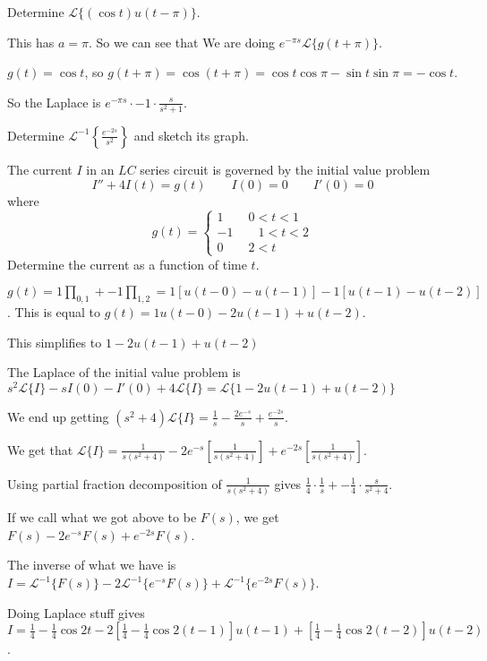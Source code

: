 \documentclass[../diffeq.tex]{subfiles}
\begin{document}
\begin{example}
    Determine $\mathcal{L}\{(\cos t)u(t-\pi)\}$.

    This has $a=\pi$. So we can see that We are doing $e^{-\pi s}\mathcal{L}\{g(t+\pi)\}$.

    $g(t)=\cos t$, so $g(t+\pi)=\cos(t+\pi)=\cos t \cos \pi - \sin t\sin \pi = -\cos t$.

    So the Laplace is $e^{-\pi s}\cdot -1\cdot \frac{s}{s^2+1}$.
\end{example}

\ex Determine $\mathcal{L}^{-1}\left\{\frac{e^{-2s}}{s^2}\right\}$ and sketch its graph.

\begin{example}
    The current $I$ in an $LC$ series circuit is governed by the initial value problem 
    \[ I''+4I(t)=g(t) \qquad I(0)=0 \qquad I'(0)=0 \]
    where 
    \[ g(t)=\begin{cases}
        1 \qquad 0<t<1 \\
        -1 \qquad 1<t<2 \\
        0 \qquad 2<t 
    \end{cases}\]
    Determine the current as a function of time $t$.

    $g(t)=1\prod_{0,1}+-1\prod_{1,2} = 1[u(t-0)-u(t-1)]-1[u(t-1)-u(t-2)]$. This is equal to $g(t)=1u(t-0)-2u(t-1)+u(t-2)$.

    This simplifies to $1-2u(t-1)+u(t-2)$

    The Laplace of the initial value problem is $s^2\mathcal{L}\{I\}-sI(0)-I'(0)+4\mathcal{L}\{I\}=\mathcal{L}\{1-2u(t-1)+u(t-2)\}$

    We end up getting $(s^2+4)\mathcal{L}\{I\}=\frac{1}{s}-\frac{2e^{-s}}{s}+\frac{e^{-2s}}{s}$.

    We get that $\mathcal{L}\{I\} = \frac{1}{s(s^2+4)}-2e^{-s}\left[\frac{1}{s(s^2+4)}\right]+e^{-2s}\left[\frac{1}{s(s^2+4)}\right]$.

    Using partial fraction decomposition of $\frac{1}{s(s^2+4)}$ gives $\frac{1}{4}\cdot \frac{1}{s}+-\frac{1}{4}\cdot \frac{s}{s^2+4}$.

    If we call what we got above to be $F(s)$, we get $F(s)-2e^{-s}F(s)+e^{-2s}F(s)$.

    The inverse of what we have is $I=\mathcal{L}^{-1}\{F(s)\}-2\mathcal{L}^{-1}\{e^{-s}F(s)\}+\mathcal{L}^{-1}\{e^{-2s}F(s)\}$.

    Doing Laplace stuff gives $I=\frac{1}{4}-\frac{1}{4}\cos 2t - 2\left[\frac{1}{4}-\frac{1}{4}\cos 2(t-1)\right]u(t-1)+\left[\frac{1}{4}-\frac{1}{4}\cos 2(t-2)\right]u(t-2)$.
\end{example}
\end{document}
